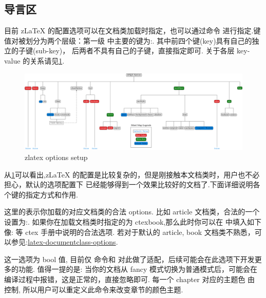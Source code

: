 \subsection{导言区}
目前 z\LaTeX{} 的配置选项可以在文档类加载时指定，也可以通过命令 \cmd{\zlatexSetup}进行指定.键值对被划分为两个层级：第一级
中主要的键为:. 其中前四个键(key)具有自己的独立的子键(sub-key)，
后两者不具有自己的子键，直接指定即可. 关于各层 key-value 的关系请见\cref{fig:zlatex-options}.

\begin{figure}[!htb]
    \centering
    \includegraphics[width=1\linewidth]{./pics/zlatex_options.pdf}
    \caption{zlatex options setup}
    \label{fig:zlatex-options}
\end{figure}

从\cref{fig:zlatex-options}可以看出,z\LaTeX{} 的配置是比较复杂的，但是刚接触本文档类时，用户也不必担心，默认的选项配置下
已经能够得到一个效果比较好的文档了.下面详细说明各个键的指定方式和作用. 

这里的表示你加载的对应文档类的合法 options. 比如 {article} 文档类，合法的一个设置为:. 如果你在加载文档类时指定的为 {ctexbook},那么此时你可以在
中填入如下像: 等 {ctex} 手册中说明的合法选项. 若对于默认的 article,
book 文档类不熟悉，可以参见:\href{https://texblog.org/2013/02/13/latex-documentclass-options-illustrated/}{latex-documentclass-options}.

这一选项为 bool 值, 目前仅 \cmd[F]{\chapter} 命令和  对此做了适配，后续可能会在此选项下开发更多的功能. 
值得一提的是: 当你的文档从 fancy 模式切换为普通模式后，可能会在编译过程中报错，这是正常的，直接忽略即可. 每一个 chapter 对应的主题色
由  控制, 所以用户可以重定义此命令来改变章节的颜色主题.

